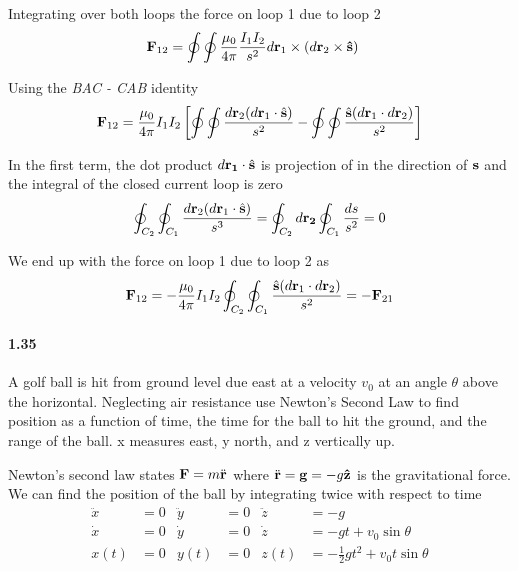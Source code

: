 \documentclass[../problems.tex]{subfiles}
\begin{document}
Integrating over both loops the force on loop 1 due to loop 2
\begin{align*}
    \mathbf{F}_{12} &= \oint \oint \frac{\mu_0}{4\pi} \frac{I_1 I_2}{s^2} d\mathbf{r}_1 
    \times (d\mathbf{r}_2 \times \mathbf{\hat s})
\end{align*}

Using the \emph{BAC - CAB} identity
\begin{align*}
    \mathbf{F}_{12} &= \frac{\mu_0}{4\pi} I_1 I_2 \left[
        \oint \oint \frac{d\mathbf{r}_2 (d\mathbf{r}_1 \cdot \hat{\mathbf{s}})}{s^2} 
        - \oint \oint \frac{\hat{\mathbf{s}} (d\mathbf{r}_1 \cdot d\mathbf{r}_2)}{s^2} \right] \\
\end{align*}

\newpage
In the first term, the dot product $d\mathbf{r_1} \cdot \hat{\mathbf{s}}$ is projection of in the 
direction of $\mathbf{s}$ and the integral of the closed current loop is zero
\begin{equation*}
    \oint_{C_2} \oint_{C_1} \frac{d\mathbf{r}_2 (d\mathbf{r}_1 \cdot \hat{\mathbf{s}})}{s^3} 
    = \oint_{C_2} d\mathbf{r_2} \oint_{C_1} \frac{ds}{s^2} = 0
\end{equation*}

We end up with the force on loop 1 due to loop 2 as 
\begin{equation*}
    \mathbf{F}_{12} = -\frac{\mu_0}{4\pi} I_1 I_2 \oint_{C_2} \oint_{C_1} \frac{\hat{\mathbf{s}} 
    (d\mathbf{r}_1 \cdot d\mathbf{r}_2)}{s^2} = -\mathbf{F}_{21}
\end{equation*}

\paragraph{1.35}
A golf ball is hit from ground level due east at a velocity $v_0$ at an angle $\theta$ above the 
horizontal. Neglecting air resistance use Newton's Second Law to find position as a function of 
time, the time for the ball to hit the ground, and the range of the ball. x measures east, y north, 
and z vertically up.
\barh

Newton's second law states $\mathbf{F} = m\ddot{\mathbf{r}}$ where $\ddot{\mathbf{r}} = \mathbf{g} 
= -g\mathbf{\hat z}$ is the gravitational force. We can find the position of the ball by integrating 
twice with respect to time
\begin{align*}
    \ddot{x} &= 0 &              \ddot{y} &= 0                & \ddot{z} &= -g\\ 
    \dot{x} &= 0 & \dot{y} &= 0 &            \dot{z} &= -gt + v_0 \sin{\theta} \\
    x(t) &= 0      & y(t) &= 0 &       z(t) &= -\frac{1}{2}gt^2 + v_0 t\sin{\theta} 
\end{align*}
\end{document}
